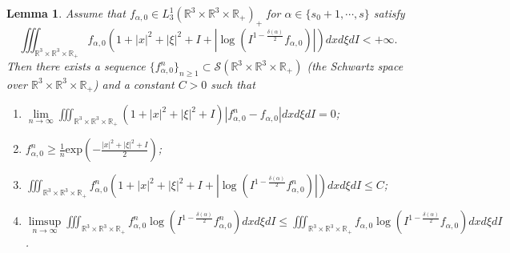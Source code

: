 \documentclass[reqno,11pt]{amsart}
\newtheorem{lemma}{Lemma}[section]
\numberwithin{equation}{section}
\def\R{\mathbb{R}}
\def\exp{\mathrm{exp}}
\begin{document}
\begin{lemma}\label{Lemma 4.9}
	Assume that $f_{\alpha,0 } \in L^1_3( \R^3 \times \R^3 \times \R_+)_+ $ for $\alpha \in \{s_0+1,\cdots ,s\}$ satisfy
	\begin{equation}\label{eq 4.51}
		\iiint_{\R^3 \times \R^3 \times \R_+ } f_{\alpha,0 } (1+|x|^2 +|\xi|^2+I + |\log (I ^{1-\frac{\delta(\alpha )}{2} } f_{\alpha,0 } )|)  dxd\xi dI<+ \infty .
	\end{equation}
	Then there exists a sequence $\{f^n_{\alpha,0 }\}_{n\geq 1} \subset \mathscr{S} (\R^3 \times \R^3 \times \R_+ ) $ (the Schwartz space over $\R^3 \times \R^3 \times \R_+$) and a constant $C > 0$ such that 
	\begin{enumerate}
		\item {$\lim \limits_{n\rightarrow \infty}  \iiint_{\R^3 \times \R^3 \times \R_+ } (1+|x|^2 +|\xi|^2+I) |f^n_{\alpha,0 } - f_{\alpha,0 }| dxd\xi dI=0 $;}\label{1 of Lemma 4.9}
		\item {$f^n_{\alpha,0 } \geq \frac{1}{n} \exp (- \frac{|x|^2+ |\xi|^2 + I }{2})$; }\label{2 of Lemma 4.9}
		\item {$\iiint_{\R^3 \times \R^3 \times \R_+ } f^n_{\alpha,0 } (1+|x|^2 +|\xi|^2 + I + |\log (I ^{1-\frac{\delta(\alpha )}{2} }f^n_{\alpha,0 })|)dxd\xi dI \leq C $;}\label{3 of Lemma 4.9}
		\item {\small $\limsup \limits_{n\rightarrow \infty} \iiint_{\R^3 \times \R^3 \times \R_+ } f^n_{\alpha,0 } \log (I ^{1-\frac{\delta(\alpha )}{2} } f^n_{\alpha,0 } ) dxd\xi dI
			\leq \iiint_{\R^3 \times \R^3 \times \R_+ } f_{\alpha,0 } \log (I ^{1-\frac{\delta(\alpha )}{2} } f_{\alpha,0 } ) dxd\xi dI$.}\label{4 of Lemma 4.9}
	\end{enumerate}
\end{lemma}
\end{document}
